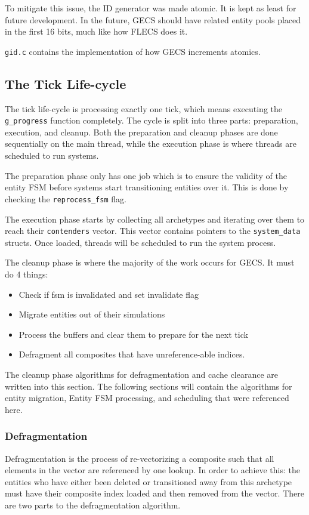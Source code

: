 To mitigate this issue, the ID generator was made atomic. It is kept as least for future development. In the future, GECS should have related entity pools placed in the first 16 bits, much like how FLECS does it.

\texttt{gid.c} contains the implementation of how GECS increments atomics.

\subsection{The Tick Life-cycle}
The tick life-cycle is processing exactly one tick, which means executing the \texttt{g\_progress} function completely. The cycle is split into three parts: preparation, execution, and cleanup. Both the preparation and cleanup phases are done sequentially on the main thread, while the execution phase is where threads are scheduled to run systems.

The preparation phase only has one job which is to ensure the validity of the entity FSM before systems start transitioning entities over it. This is done by checking the \texttt{reprocess\_fsm} flag.

The execution phase starts by collecting all archetypes and iterating over them to reach their \texttt{contenders} vector. This vector contains pointers to the \texttt{system\_data} structs. Once loaded, threads will be scheduled to run the system process.

The cleanup phase is where the majority of the work occurs for GECS. It must do 4 things:
\begin{itemize}
    \item Check if fsm is invalidated and set invalidate flag
    \item Migrate entities out of their simulations
    \item Process the buffers and clear them to prepare for the next tick
    \item Defragment all composites that have unreference-able indices.
\end{itemize}

The cleanup phase algorithms for defragmentation and cache clearance are written into this section. The following sections will contain the algorithms for entity migration, Entity FSM processing, and scheduling that were referenced here.

\subsubsection{Defragmentation}
Defragmentation is the process of re-vectorizing a composite such that all elements in the vector are referenced by one lookup. In order to achieve this: the entities who have either been deleted or transitioned away from this archetype must have their composite index loaded and then removed from the vector. There are two parts to the defragmentation algorithm.

